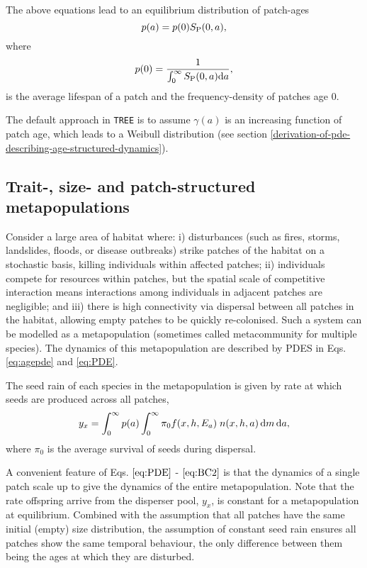 \documentclass[10pt,twoside]{article}
\begin{document}
The above equations lead to an equilibrium distribution of patch-ages
\begin{equation} p(a) = p(0) S_{\rm P} (0,a),
\end{equation}
where
\begin{equation}
  p(0) = \frac1{\int_0^\infty S_{\rm P} (0,a) {\rm d}a},
\end{equation}
is the average lifespan of a patch and the frequency-density of patches
age \(0\).

The default approach in \texttt{TREE} is to assume  $\gamma(a)$ is an 
increasing function of patch age, which leads to a Weibull distribution
(see section \ref{derivation-of-pde-describing-age-structured-dynamics}).

\subsection{Trait-, size- and patch-structured
metapopulations}\label{trait--size--and-patch-structured-metapopulations}

Consider a large area of habitat where: i) disturbances (such as fires,
storms, landslides, floods, or disease outbreaks) strike patches of the
habitat on a stochastic basis, killing individuals within affected
patches; ii) individuals compete for resources within patches, but the
spatial scale of competitive interaction means interactions among
individuals in adjacent patches are negligible; and iii) there is high
connectivity via dispersal between all patches in the habitat, allowing
empty patches to be quickly re-colonised. Such a system can be modelled
as a metapopulation (sometimes called metacommunity for multiple
species). The dynamics of this metapopulation are described by PDES in
Eqs. \ref{eq:agepde} and \ref{eq:PDE}.

The seed rain of each species in the metapopulation is given by rate at
which seeds are produced across all patches,
\begin{equation}  \label{eq:seed_rain} 
  y_x = \int_0^{\infty} p(a)  \int_0^{\infty}  \pi_0 f(x,h,E_a) \; n(x,h,a)\,{\rm d} m \, {\rm d} a,
\end{equation}
where \(\pi_0\) is the average survival of seeds during dispersal.

A convenient feature of Eqs. \(\ref{eq:PDE}\) - \(\ref{eq:BC2}\) is that
the dynamics of a single patch scale up to give the dynamics of the
entire metapopulation. Note that the rate offspring arrive from the
disperser pool, \(y_x\), is constant for a metapopulation at
equilibrium. Combined with the assumption that all patches have the same
initial (empty) size distribution, the assumption of constant seed rain
ensures all patches show the same temporal behaviour, the only
difference between them being the ages at which they are disturbed.
\end{document}

